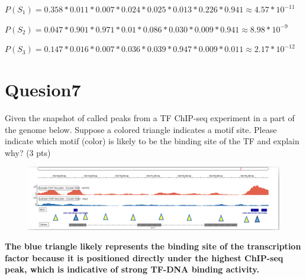 \documentclass{article}
\begin{document}
$P(S_1) = 0.358 *  0.011 *  0.007 * 0.024 *0.025 * 0.013 *0.226 * 0.941 \approx 4.57 * 10^{-11}$ 

$P(S_2) = 0.047 *  0.901 *  0.971 * 0.01 *0.086 * 0.030 *0.009 * 0.941 \approx 8.98 * 10^{-9}$ 

$P(S_3) = 0.147 *  0.016 *  0.007 * 0.036 *0.039 * 0.947 *0.009 * 0.011 \approx 2.17* 10^{-12} $ 

\section{Quesion7}

Given the snapshot of called peaks from a TF ChIP-seq experiment in a part of the genome below. Suppose a colored triangle indicates a motif site. Please indicate which motif (color) is likely to be the binding site of the TF and explain why? (3 pts)


\begin{figure}[H]
    \centering
    \includegraphics[width=1\textwidth]{q7.png}
\end{figure}


\textbf{The blue triangle likely represents the binding site of the transcription factor because it is positioned directly under the highest ChIP-seq peak, which is indicative of strong TF-DNA binding activity. }
\end{document}
